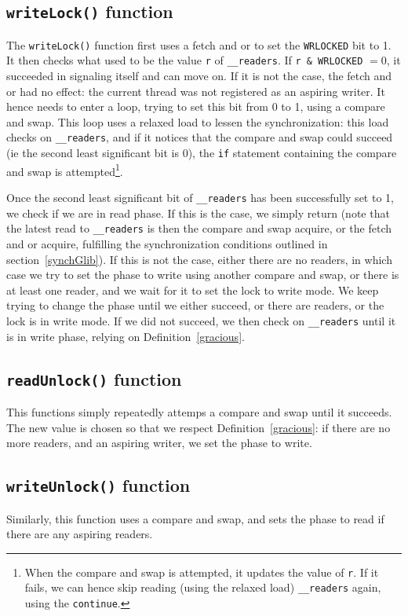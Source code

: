 		\subsection{\texttt{writeLock()} function}

		The \texttt{writeLock()} function first uses a fetch and or to set the \texttt{WRLOCKED} bit to 1. It then checks what used to be the value \texttt{r} of \texttt{\_\_readers}. If \texttt{r \& WRLOCKED} $= 0$, it succeeded in signaling itself and can move on. If it is not the case, the fetch and or had no effect: the current thread was not registered as an aspiring writer. It hence needs to enter a loop, trying to set this bit from 0 to 1, using a compare and swap. This loop uses a relaxed load to lessen the synchronization: this load checks on \texttt{\_\_readers}, and if it notices that the compare and swap could succeed (ie the second least significant bit is 0), the \texttt{if} statement containing the compare and swap is attempted\footnote{When the compare and swap is attempted, it updates the value of \texttt{r}. If it fails, we can hence skip reading (using the relaxed load) \texttt{\_\_readers} again, using the \texttt{continue}.}. 

		Once the second least significant bit of \texttt{\_\_readers} has been successfully set to 1, we check if we are in read phase. If this is the case, we simply return (note that the latest read to \texttt{\_\_readers} is then the compare and swap acquire, or the fetch and or acquire, fulfilling the synchronization conditions outlined in section~\ref{synchGlib}). If this is not the case, either there are no readers, in which case we try to set the phase to write using another compare and swap, or there is at least one reader, and we wait for it to set the lock to write mode. We keep trying to change the phase until we either succeed, or there are readers, or the lock is in write mode. If we did not succeed, we then check on \texttt{\_\_readers} until it is in write phase, relying on Definition~\ref{gracious}.

		\subsection{\texttt{readUnlock()} function}

		This functions simply repeatedly attemps a compare and swap until it succeeds. The new value is chosen so that we respect Definition~\ref{gracious}: if there are no more readers, and an aspiring writer, we set the phase to write.

		\subsection{\texttt{writeUnlock()} function}

		Similarly, this function uses a compare and swap, and sets the phase to read if there are any aspiring readers.
